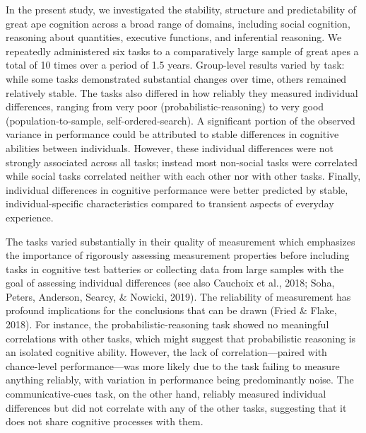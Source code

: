 \documentclass[
  man,floatsintext]{apa6}
\begin{document}
In the present study, we investigated the stability, structure and predictability of great ape cognition across a broad range of domains, including social cognition, reasoning about quantities, executive functions, and inferential reasoning. We repeatedly administered six tasks to a comparatively large sample of great apes a total of 10 times over a period of 1.5 years. Group-level results varied by task: while some tasks demonstrated substantial changes over time, others remained relatively stable. The tasks also differed in how reliably they measured individual differences, ranging from very poor (probabilistic-reasoning) to very good (population-to-sample, self-ordered-search). A significant portion of the observed variance in performance could be attributed to stable differences in cognitive abilities between individuals. However, these individual differences were not strongly associated across all tasks; instead most non-social tasks were correlated while social tasks correlated neither with each other nor with other tasks. Finally, individual differences in cognitive performance were better predicted by stable, individual-specific characteristics compared to transient aspects of everyday experience.

The tasks varied substantially in their quality of measurement which emphasizes the importance of rigorously assessing measurement properties before including tasks in cognitive test batteries or collecting data from large samples with the goal of assessing individual differences (see also Cauchoix et al., 2018; Soha, Peters, Anderson, Searcy, \& Nowicki, 2019). The reliability of measurement has profound implications for the conclusions that can be drawn (Fried \& Flake, 2018). For instance, the probabilistic-reasoning task showed no meaningful correlations with other tasks, which might suggest that probabilistic reasoning is an isolated cognitive ability. However, the lack of correlation---paired with chance-level performance---was more likely due to the task failing to measure anything reliably, with variation in performance being predominantly noise. The communicative-cues task, on the other hand, reliably measured individual differences but did not correlate with any of the other tasks, suggesting that it does not share cognitive processes with them.
\end{document}
